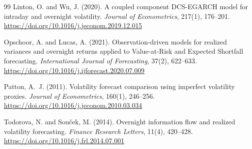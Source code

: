 \documentclass[11pt,a4paper]{article}
\begin{document}
\begin{thebibliography}{99}
Linton, O. and Wu, J. (2020).
\newblock A coupled component DCS-EGARCH model for intraday and overnight volatility.
\newblock \emph{Journal of Econometrics}, 217(1), 176--201.
\newblock \url{https://doi.org/10.1016/j.jeconom.2019.12.015}

Opschoor, A. and Lucas, A. (2021).
\newblock Observation-driven models for realized variances and overnight returns applied to Value-at-Risk and Expected Shortfall forecasting.
\newblock \emph{International Journal of Forecasting}, 37(2), 622--633.
\newblock \url{https://doi.org/10.1016/j.ijforecast.2020.07.009}

Patton, A.~J. (2011).
\newblock Volatility forecast comparison using imperfect volatility proxies.
\newblock \emph{Journal of Econometrics}, 160(1), 246--256.
\newblock \url{https://doi.org/10.1016/j.jeconom.2010.03.034}

Todorova, N. and Sou\v{c}ek, M. (2014).
\newblock Overnight information flow and realized volatility forecasting.
\newblock \emph{Finance Research Letters}, 11(4), 420--428.
\newblock \url{https://doi.org/10.1016/j.frl.2014.07.001}

\end{thebibliography}
\end{document}
